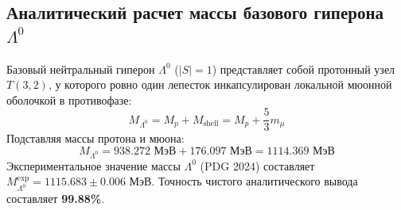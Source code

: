 \documentclass[12pt,a4paper]{article}
\begin{document}
\subsection{Аналитический расчет массы базового гиперона $\Lambda^0$}
Базовый нейтральный гиперон $\Lambda^0$ ($|S|=1$) представляет собой протонный узел $T(3,2)$, у которого ровно один лепесток инкапсулирован локальной мюонной оболочкой в противофазе:
\begin{equation}
	M_{\Lambda^0} = M_p + M_{\text{shell}} = M_p + \frac{5}{3} m_\mu
\end{equation}
Подставляя массы протона и мюона:
\begin{equation}
	M_{\Lambda^0} = 938.272 \text{ МэВ} + 176.097 \text{ МэВ} = \mathbf{1114.369 \text{ МэВ}}
\end{equation}
Экспериментальное значение массы $\Lambda^0$ (PDG 2024) составляет $M_{\Lambda^0}^{\text{exp}} = \mathbf{1115.683 \pm 0.006 \text{ МэВ}}$. 
Точность чистого аналитического вывода составляет \textbf{99.88\%}.
\end{document}

